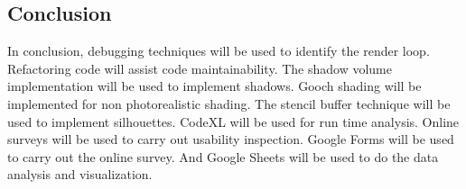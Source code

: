 \documentclass[10pt,journal,compsoc,draftclsnofoot]{IEEEtran}
\begin{document}
\newpage

\subsection{Conclusion}
In conclusion, debugging techniques will be used to identify the render loop.
Refactoring code will assist code maintainability.
The shadow volume implementation will be used to implement shadows.
Gooch shading will be implemented for non photorealistic shading.
The stencil buffer technique will be used to implement silhouettes.
CodeXL will be used for run time analysis.
Online surveys will be used to carry out usability inspection.
Google Forms will be used to carry out the online survey.
And Google Sheets will be used to do the data analysis and visualization.



\end{document}
